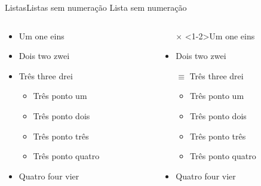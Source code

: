 \documentclass[
    brazilian, %
    12pt, %
    aspectratio = 169, %
]{beamer}
\begin{document}
\begin{frame}{Listas}{Listas sem numeração}
    Lista sem numeração
    \begin{columns}
        \begin{column}{0.45\linewidth}
            \begin{itemize}
                \item Um one eins
                \item Dois two zwei
                \item Três three drei
                \begin{itemize}
                    \item Três ponto um
                    \item Três ponto dois
                    \item Três ponto três
                    \item Três ponto quatro
                \end{itemize}
                \item Quatro four vier
            \end{itemize}
        \end{column}
        \begin{column}{0.45\linewidth}
            \begin{itemize}
                \item [$\times$]<1-2>Um one eins
                \item <3>[$\times$]Dois two zwei
                \item [$\equiv$]Três three drei
                \begin{itemize}[<+->]
                    \item Três ponto um
                    \item Três ponto dois
                    \item Três ponto três
                    \item Três ponto quatro
                \end{itemize}

                \item Quatro four vier
            \end{itemize}
        \end{column}
    \end{columns}
\end{frame}
\end{document}
